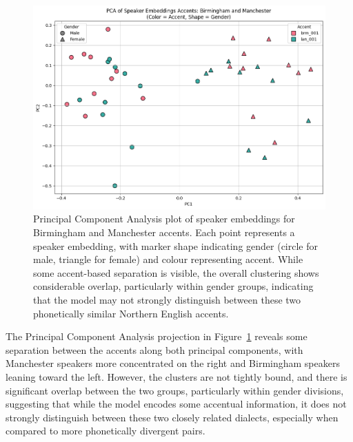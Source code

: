 \documentclass[conference]{IEEEtran}
\begin{document}
	\begin{figure}[H]
		\centering
		\includegraphics[width=1\linewidth]{img/img-cluster-brm-lan}
		\caption{Principal Component Analysis plot of speaker embeddings for Birmingham and Manchester accents. Each point represents a speaker embedding, with marker shape indicating gender (circle for male, triangle for female) and colour representing accent. While some accent-based separation is visible, the overall clustering shows considerable overlap, particularly within gender groups, indicating that the model may not strongly distinguish between these two phonetically similar Northern English accents.}
		\label{fig:img-cluster-brm-lan}
	\end{figure}
	
	The Principal Component Analysis projection in Figure~\ref{fig:img-cluster-brm-lan} reveals some separation between the accents along both principal components, with Manchester speakers more concentrated on the right and Birmingham speakers leaning toward the left. However, the clusters are not tightly bound, and there is significant overlap between the two groups, particularly within gender divisions, suggesting that while the model encodes some accentual information, it does not strongly distinguish between these two closely related dialects, especially when compared to more phonetically divergent pairs.
	
\end{document}

